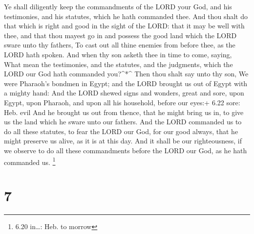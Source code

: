  Ye shall diligently keep the commandments of the LORD your
God, and his testimonies, and his statutes, which he hath commanded
thee.  And thou shalt do that which is right and good in
the sight of the LORD: that it may be well with thee, and that thou
mayest go in and possess the good land which the LORD sware unto thy
fathers,  To cast out all thine enemies from before thee,
as the LORD hath spoken.  And when thy son asketh thee in
time to come, saying, What mean the testimonies, and the statutes, and
the judgments, which the LORD our God hath commanded you?\^{}*\^{}
 Then thou shalt say unto thy son, We were Pharaoh's
bondmen in Egypt; and the LORD brought us out of Egypt with a mighty
hand:  And the LORD shewed signs and wonders, great and
sore, upon Egypt, upon Pharaoh, and upon all his household, before our
eyes:+ 6.22 sore: Heb. evil  And he brought us out from
thence, that he might bring us in, to give us the land which he sware
unto our fathers.  And the LORD commanded us to do all
these statutes, to fear the LORD our God, for our good always, that he
might preserve us alive, as it is at this day.  And it
shall be our righteousness, if we observe to do all these commandments
before the LORD our God, as he hath commanded us. \footnote{6.20
  in\ldots: Heb. to morrow}

\hypertarget{section-6}{%
\section{7}\label{section-6}}

